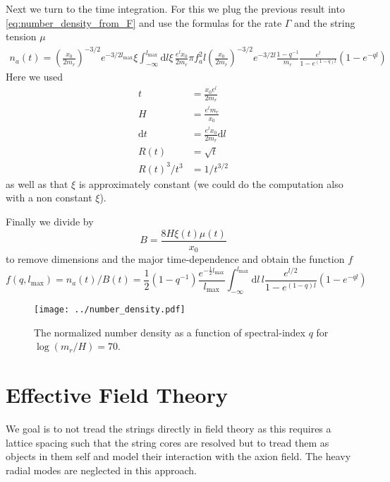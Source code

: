 \documentclass[a4paper]{article}
\begin{document}
Next we turn to the time integration. For this we plug the previous result into \eqref{eq:number_density_from_F} and use the formulas for the rate $\Gamma$ and the string tension $\mu$
\begin{align}
	n_a(t) = \left( \frac{x_0}{2 m_r} \right)^{-3/2} e^{-3/2 l_\mathrm{max}} \xi \int_{-\infty}^{l_\mathrm{max}} \mathrm{d} l \xi \, \frac{e^l x_0}{2 m_r} \pi f_a^2 l  \left( \frac{x_0}{2 m_r} \right)^{-3/2} e^{-3/2 l} \frac{1 - q^{-1}}{m_r} \frac{e^l}{1 - e^{(1 - q) l}} (1 - e^{-ql})
\end{align}
Here we used 
\begin{align}
	t &= \frac{x_0 e^l}{2 m_r} \\
	H  &= \frac{e^{l} m_r}{x_0} \\
	\mathrm{d} t &= \frac{e^l x_0}{2 m_r} \mathrm{d} l \\
	R(t) &= \sqrt{t} \\
	R(t)^3 / t^3 &= 1 / t^{3/2}
\end{align}
as well as that $\xi$ is approximately constant (we could do the computation also with a non constant $\xi$).

Finally we divide by 
\begin{equation}
	B = \frac{8 H \xi(t) \mu(t)}{x_0}
\end{equation}
to remove dimensions and the major time-dependence 
and obtain the function $f$
\begin{equation}
	f(q, l_\mathrm{max}) = n_a(t) / B(t) = \frac{1}{2} (1 - q^{-1}) \frac{e^{- \frac{1}{2} l_\mathrm{max}}}{l_\mathrm{max}} \int_{-\infty}^{l_\mathrm{max}} \mathrm{d} l \, l \frac{e^{l/2}}{1 - e^{(1 - q) l}} (1 - e^{-ql})
\end{equation}

\begin{figure}[H]
	\texttt{[image: ../number\_density.pdf]}
	\caption{The normalized number density as a function of spectral-index $q$ for $\log(m_r/H) = 70$.}
\end{figure}


\newpage
\section{Effective Field Theory}
We goal is to not tread the strings directly in field theory as this requires a lattice spacing such that the 
string cores are resolved but to tread them as objects in them self and model their interaction with the axion field.
The heavy radial modes are neglected in this approach. 
\end{document}

